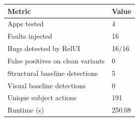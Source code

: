 \begin{tabular}{ll}
\toprule
Metric & Value \\
\midrule
Apps tested & 4 \\
Faults injected & 16 \\
Bugs detected by RelUI & 16/16 \\
False positives on clean variants & 0 \\
Structural baseline detections & 5 \\
Visual baseline detections & 0 \\
Unique subject actions & 191 \\
Runtime (s) & 250.08 \\
\bottomrule
\end{tabular}
